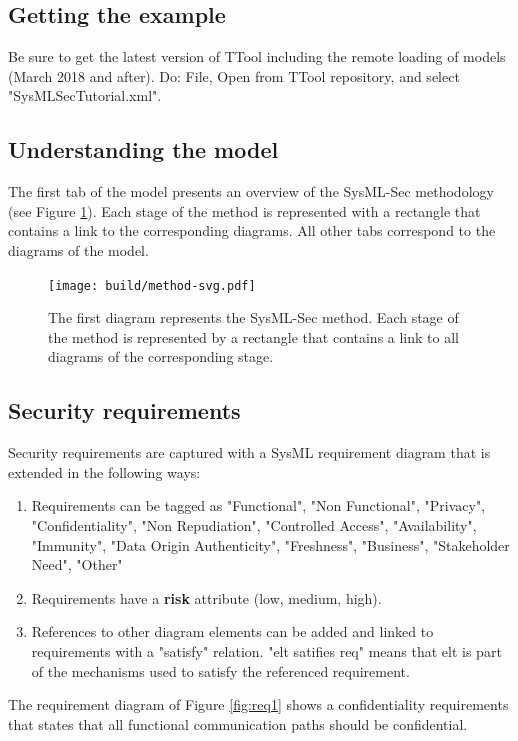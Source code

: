 \documentclass[12pt]{article}
\begin{document}
\subsection{Getting the example}
Be sure to get the latest version of TTool including the remote loading of models (March 2018 and after). Do: File, Open from TTool repository, and select "SysMLSecTutorial.xml".

\subsection{Understanding the model}
The first tab of the model presents an overview of the SysML-Sec methodology (see Figure \ref{fig:method}). Each stage of the method is represented with a rectangle that contains a link to the corresponding diagrams.  All other tabs correspond to the diagrams of the model.


\begin{figure}[htbp]
\centering
\texttt{[image: build/method-svg.pdf]}

\caption{The first diagram represents the SysML-Sec method. Each stage of the method is represented by a rectangle that contains a link to all diagrams of the corresponding stage.} \label{fig:method}
\end{figure}

\subsection{Security requirements}
Security requirements are captured with a SysML requirement diagram that is extended in the following ways:
\begin{enumerate}
\item Requirements can be tagged as "Functional", "Non Functional", "Privacy", "Confidentiality", "Non Repudiation", "Controlled Access", "Availability", "Immunity", "Data Origin Authenticity", "Freshness", "Business", "Stakeholder Need", "Other"
\item Requirements have a \textbf{risk} attribute (low, medium, high).
\item References to other diagram elements can be added and linked to requirements with a "satisfy" relation. "elt satifies req" means that elt is part of the mechanisms used to satisfy the referenced requirement.
\end{enumerate}

The requirement diagram of Figure \ref{fig:req1} shows a confidentiality requirements that states that all functional communication paths should be confidential.
\end{document}
